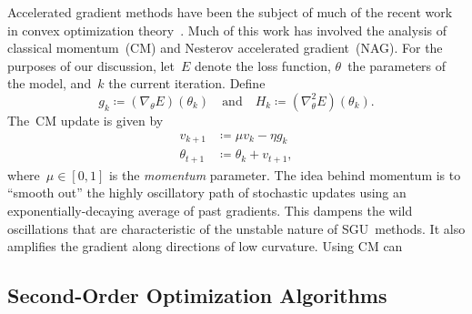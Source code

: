\documentclass[11pt,a4paper]{article}
\numberwithin{equation}{section}
\begin{document}
Accelerated gradient methods have been the subject of much of the recent work in
convex optimization theory~\citep{sutskever2013importance}. Much of this work
has involved the analysis of classical momentum~(CM) and Nesterov accelerated
gradient~(NAG). For the purposes of our discussion, let~$E$ denote the loss
function, $\theta$~the parameters of the model, and~$k$ the current iteration.
Define
\[
	g_k \coloneqq (\nabla_\theta E)(\theta_k)
	\quad\text{and}\quad
	H_k \coloneqq (\nabla^2_\theta E)(\theta_k).
\]
The~CM update is given by
\begin{align*}
	v_{k + 1} &\coloneqq \mu v_k - \eta g_k \\
	\theta_{t + 1} &\coloneqq \theta_k + v_{t + 1},
\end{align*}
where~$\mu \in [0, 1]$ is the \emph{momentum} parameter. The idea behind
momentum is to ``smooth out'' the highly oscillatory path of stochastic updates
using an exponentially-decaying average of past gradients. This dampens the wild
oscillations that are characteristic of the unstable nature of SGU~methods. It
also amplifies the gradient along directions of low curvature. Using CM can 


\subsection{Second-Order Optimization Algorithms}



\end{document}
